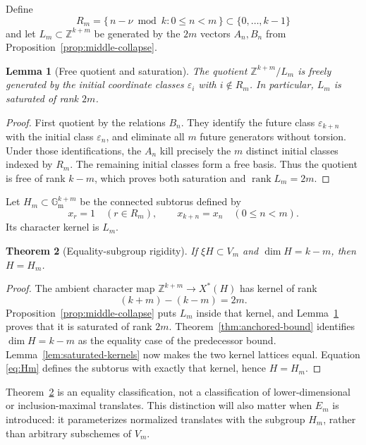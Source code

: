 \documentclass[11pt]{article}
\newcommand{\Gm}{\mathbb{G}_{\mathrm m}}
\newcommand{\Z}{\mathbb{Z}}
\newcommand{\rank}{\operatorname{rank}}
\newcommand{\eps}{\varepsilon}
\newtheorem{lemma}{Lemma}[section]
\newtheorem{theorem}[lemma]{Theorem}
\theoremstyle{remark}
\numberwithin{equation}{section}
\begin{document}
Define
\[
 R_m=\{\,n-\nu\bmod k:0\leq n<m\,\}\subset\{0,\ldots,k-1\}
\]
and let \(L_m\subset\Z^{k+m}\) be generated by the \(2m\) vectors \(A_n,B_n\) from Proposition~\ref{prop:middle-collapse}.

\begin{lemma}[Free quotient and saturation]\label{lem:free-quotient}
The quotient \(\Z^{k+m}/L_m\) is freely generated by the initial coordinate classes \(\eps_i\) with \(i\notin R_m\).  In particular, \(L_m\) is saturated of rank \(2m\).
\end{lemma}

\begin{proof}
First quotient by the relations \(B_n\).  They identify the future class \(\eps_{k+n}\) with the initial class \(\eps_n\), and eliminate all \(m\) future generators without torsion.  Under those identifications, the \(A_n\) kill precisely the \(m\) distinct initial classes indexed by \(R_m\).  The remaining initial classes form a free basis.  Thus the quotient is free of rank \(k-m\), which proves both saturation and \(\rank L_m=2m\).
\end{proof}

Let \(H_m\subset\Gm^{k+m}\) be the connected subtorus defined by
\begin{equation}\label{eq:Hm}
 x_r=1\quad(r\in R_m),\qquad
 x_{k+n}=x_n\quad(0\leq n<m).
\end{equation}
Its character kernel is \(L_m\).

\begin{theorem}[Equality-subgroup rigidity]\label{thm:equality-rigidity}
If \(\xi H\subset V_m\) and \(\dim H=k-m\), then \(H=H_m\).
\end{theorem}

\begin{proof}
The ambient character map \(\Z^{k+m}\to X^\ast(H)\) has kernel of rank
\[
 (k+m)-(k-m)=2m.
\]
Proposition~\ref{prop:middle-collapse} puts \(L_m\) inside that kernel, and Lemma~\ref{lem:free-quotient} proves that it is saturated of rank \(2m\).  Theorem~\ref{thm:anchored-bound} identifies \(\dim H=k-m\) as the equality case of the predecessor bound.  Lemma~\ref{lem:saturated-kernels} now makes the two kernel lattices equal.  Equation \eqref{eq:Hm} defines the subtorus with exactly that kernel, hence \(H=H_m\).
\end{proof}

Theorem~\ref{thm:equality-rigidity} is an equality classification, not a classification of lower-dimensional or inclusion-maximal translates.  This distinction will also matter when \(E_m\) is introduced: it parameterizes normalized translates with the subgroup \(H_m\), rather than arbitrary subschemes of \(V_m\).
\end{document}

